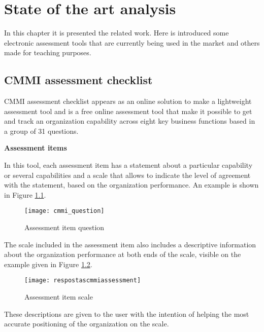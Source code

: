 \chapter{State of the art analysis}\label{chap:chap3}

In this chapter it is presented the related work. Here is introduced  some electronic assessment tools that are currently being used in the market and others made for teaching purposes.

\section{CMMI assessment checklist}\label{cmmicheck}

CMMI assessment checklist \citep{capabilityassess} appears as an online solution to make a lightweight assessment tool and is a free online assessment tool that make it possible to get and track an organization capability across eight key business functions based in a group of 31 questions.


\textbf{Assessment items}

In this tool, each assessment item has a statement about a particular capability or several capabilities and a scale that allows to indicate the level of agreement with the statement, based on the organization performance. An example is shown in Figure \ref{fig:cmmi_question}.

\begin{figure}[h]
	\begin{center}
		\leavevmode
		\texttt{[image: cmmi\_question]}
		\caption{Assessment item question}
		\label{fig:cmmi_question}
	\end{center}
\end{figure}

The scale included in the assessment item also includes a descriptive information about the organization performance at both ends of the scale, visible on the example given in Figure \ref{fig:assesment_answer}.

\begin{figure}[h]
	\begin{center}
		\leavevmode
		\texttt{[image: respostascmmiassessment]}
		\caption{Assessment item scale}
		\label{fig:assesment_answer}
	\end{center}
\end{figure}

These descriptions are given to the user with the intention of helping the most accurate positioning of the organization on the scale.

